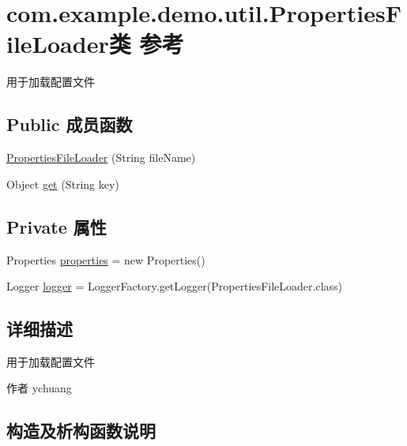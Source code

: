 \hypertarget{classcom_1_1example_1_1demo_1_1util_1_1_properties_file_loader}{}\section{com.\+example.\+demo.\+util.\+Properties\+File\+Loader类 参考}
\label{classcom_1_1example_1_1demo_1_1util_1_1_properties_file_loader}


用于加载配置文件  


\subsection*{Public 成员函数}
\begin{DoxyCompactItemize}
\item 
\mbox{\hyperlink{classcom_1_1example_1_1demo_1_1util_1_1_properties_file_loader_a764584cb7f3369eb66fb2d5585f2485f}{Properties\+File\+Loader}} (String file\+Name)
\item 
Object \mbox{\hyperlink{classcom_1_1example_1_1demo_1_1util_1_1_properties_file_loader_a09d5adc0f376ce832a30d29ac65663a1}{get}} (String key)
\end{DoxyCompactItemize}
\subsection*{Private 属性}
\begin{DoxyCompactItemize}
\item 
Properties \mbox{\hyperlink{classcom_1_1example_1_1demo_1_1util_1_1_properties_file_loader_a76002c6164ddd89110636049267a77dc}{properties}} = new Properties()
\item 
Logger \mbox{\hyperlink{classcom_1_1example_1_1demo_1_1util_1_1_properties_file_loader_a83f453c1d42cf9ecff2da19e6d0ae63d}{logger}} = Logger\+Factory.\+get\+Logger(Properties\+File\+Loader.\+class)
\end{DoxyCompactItemize}


\subsection{详细描述}
用于加载配置文件 

\begin{DoxyAuthor}{作者}
ychuang 
\end{DoxyAuthor}


\subsection{构造及析构函数说明}
\mbox{\label{classcom_1_1example_1_1demo_1_1util_1_1_properties_file_loader_a764584cb7f3369eb66fb2d5585f2485f}} 
